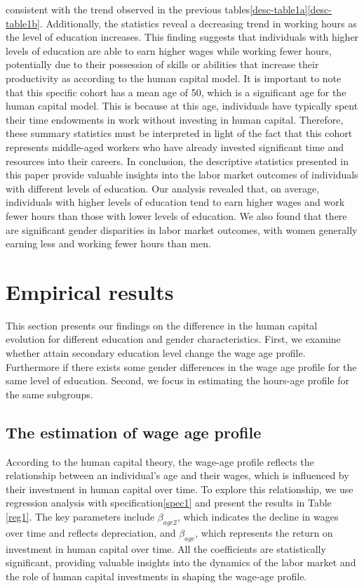 \documentclass{sistedes}
\begin{document}
consistent with the trend observed in the previous  tables\ref{desc-table1a}\ref{desc-table1b}. Additionally, the
statistics reveal a decreasing trend in working hours as the level of education increases. This finding suggests that
individuals with higher levels of education are able to earn higher wages while working fewer hours, potentially due to
their possession of skills or abilities that increase their productivity as according to the human capital model. It is
important to note that this specific cohort has a mean age of 50, which is a significant age for the human capital
model. This is because at this age, individuals have typically spent their time endowments in work without investing in
human capital. Therefore, these summary statistics must be interpreted in light of the fact that this cohort represents
middle-aged workers who have already invested significant time and resources into their careers.\newline
In conclusion, the descriptive statistics presented in this paper provide valuable insights into the labor market
outcomes of individuals with different levels of education. Our analysis revealed that, on average, individuals with
higher levels of education tend to earn higher wages and work fewer hours than those with lower levels of education. We
also found that there are significant gender disparities in labor market outcomes, with women generally earning less and
working fewer hours than men.
\section{Empirical results}
This section presents our findings on the difference in the human capital evolution for different education and gender
characteristics. First, we examine whether attain secondary education level change the wage age profile. Furthermore if
there exists some gender differences in the wage age profile for the same level of education. Second, we focus in
estimating the hours-age profile for the same subgroups.
\subsection{The estimation of wage age profile}
According to the human capital theory, the wage-age profile reflects the relationship between an individual's age and their wages, which is influenced by their investment in human capital over time. To explore this relationship, we use regression analysis with specification\ref{spec1} and present the results in Table \ref{reg1}. The key parameters include $\beta_{age2}$, which indicates the decline in wages over time and reflects depreciation, and $\beta_{age}$, which represents the return on investment in human capital over time. All the coefficients are statistically significant, providing valuable insights into the dynamics of the labor market and the role of human capital investments in shaping the wage-age profile.
\end{document}
